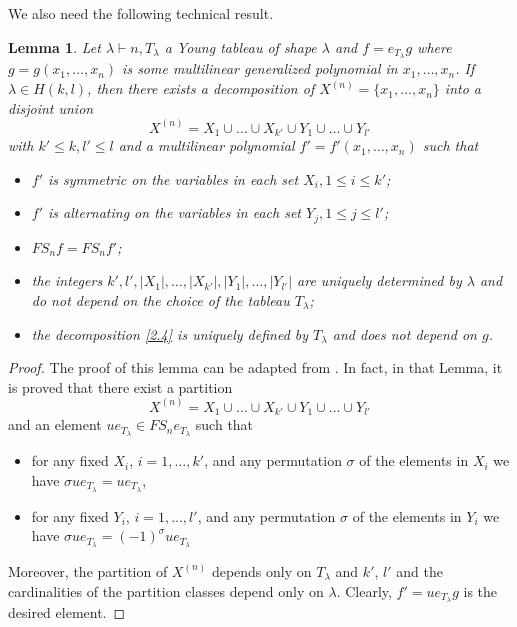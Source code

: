 \documentclass{article}
\newtheorem{lemma}[theorem]{Lemma}
\begin{document}
We also need the following technical result.

\begin{lemma}
    \label{2.5.6}
    Let $\lambda \vdash n, T_\lambda$ a Young tableau of shape $\lambda$ and $f=e_{T_\lambda}g$ where $g=g(x_1,\ldots,x_n)$ is some multilinear generalized polynomial in $x_1,\ldots,x_n$. If $\lambda \in H(k,l)$, then there exists a decomposition of $X^{(n)}=\{ x_1,\ldots,x_n\}$ into a disjoint union
    \begin{equation}
        \label{2.4}
        X^{(n)}=X_1 \cup \ldots \cup X_{k'}\cup Y_1 \cup \ldots \cup Y_{l'}
    \end{equation}
    with $k' \le k, l' \le l$ and a multilinear polynomial $f'=f'(x_1,\ldots,x_n)$ such that 
    \begin{itemize} 
        \item $f'$ is symmetric on the variables in each set $X_i, 1 \le i \le k'$;
        \item $f'$ is alternating on the variables in each set $Y_j, 1 \le j \le l'$;
        \item $FS_nf=FS_nf'$;
        \item the integers $k',l', |X_1|,\ldots,|X_{k'}|,|Y_1|,\ldots,|Y_{l'}|$ are uniquely determined by $\lambda$ and do not depend on the choice of the tableau $T_\lambda$;
        \item the decomposition \eqref{2.4} is uniquely defined by $T_\lambda$ and does not depend on $g$.
    \end{itemize}
\end{lemma}
\begin{proof}
	The proof of this lemma can be adapted from \cite[Lemma 2.5.6]{GZ05}. In fact, in that Lemma, it is proved that there exist a partition 
	\[X^{(n)}=X_1 \cup \ldots \cup X_{k'}\cup Y_1 \cup \ldots \cup Y_{l'}\]
	and an element $ue_{T_\lambda} \in FS_n e_{T_\lambda}$ such that \begin{itemize}
		\item for any fixed $X_i$, $i=1,\dots,k'$, and any permutation $\sigma$ of the elements in $X_i$ we have $\sigma ue_{T_\lambda} =ue_{T_\lambda}$,
		\item for any fixed $Y_i$, $i=1,\dots,l'$, and any permutation $\sigma$ of the elements in $Y_i$ we have $\sigma ue_{T_\lambda} = (-1)^\sigma ue_{T_\lambda} $
	\end{itemize} 
	Moreover, the partition of $X^{(n)}$ depends only on $T_\lambda$ and $k'$, $l'$ and the cardinalities of the partition classes depend only on $\lambda$. Clearly, $f'= ue_{T_\lambda}g$ is the desired element.
\end{proof}
\end{document}
